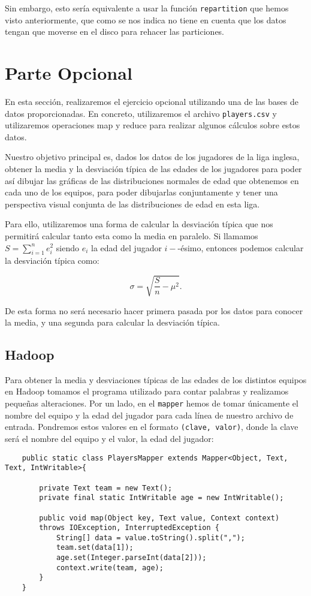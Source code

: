 \documentclass[11pt]{article}
\def\inline{\lstinline[basicstyle=\ttfamily,keywordstyle={}]}
\begin{document}
Sin embargo, esto sería equivalente a usar la función \inline{repartition} que hemos visto anteriormente, que como se nos indica no tiene en cuenta que los datos tengan que moverse en el disco para rehacer las particiones.

\section{Parte Opcional}

En esta sección, realizaremos el ejercicio opcional utilizando una de las bases de datos proporcionadas. En concreto, utilizaremos el archivo \inline{players.csv} y utilizaremos operaciones map y reduce para realizar algunos cálculos sobre estos datos.

Nuestro objetivo principal es, dados los datos de los jugadores de la liga inglesa, obtener la media y la desviación típica de las edades de los jugadores para poder así dibujar las gráficas de las distribuciones normales de edad que obtenemos en cada uno de los equipos, para poder dibujarlas conjuntamente y tener una perspectiva visual conjunta de las distribuciones de edad en esta liga.

Para ello, utilizaremos una forma de calcular la desviación típica que nos permitirá calcular tanto esta como la media en paralelo. Si llamamos $S = \sum_{i=1}^n e_i^2$ siendo $e_i$ la edad del jugador $i-$-ésimo, entonces podemos calcular la desviación típica como:

\[
\sigma = \sqrt{\frac{S}{n} - \mu^2}.
\]

De esta forma no será necesario hacer primera pasada por los datos para conocer la media, y una segunda para calcular la desviación típica.

\subsection{Hadoop}

Para obtener la media y desviaciones típicas de las edades de los distintos equipos en Hadoop tomamos el programa utilizado para contar palabras y realizamos pequeñas alteraciones. Por un lado, en el \inline{mapper} hemos de tomar únicamente el nombre del equipo y la edad del jugador para cada línea de nuestro archivo de entrada. Pondremos estos valores en el formato \inline{(clave, valor)}, donde la clave será el nombre del equipo y el valor, la edad del jugador:

\begin{verbatim}
	public static class PlayersMapper extends Mapper<Object, Text, Text, IntWritable>{
		
		private Text team = new Text();
		private final static IntWritable age = new IntWritable();
		
		public void map(Object key, Text value, Context context)
		throws IOException, InterruptedException {
			String[] data = value.toString().split(",");
			team.set(data[1]);
			age.set(Integer.parseInt(data[2]));
			context.write(team, age);
		}
	}
\end{verbatim}
\end{document}
